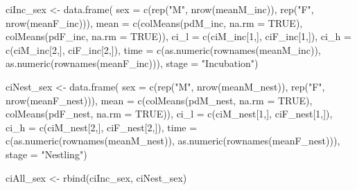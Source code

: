 \documentclass[
]{article}
\newenvironment{Shaded}{\begin{snugshade}}{\end{snugshade}}
\newcommand{\AttributeTok}[1]{\textcolor[rgb]{0.77,0.63,0.00}{#1}}
\newcommand{\ConstantTok}[1]{\textcolor[rgb]{0.00,0.00,0.00}{#1}}
\newcommand{\DecValTok}[1]{\textcolor[rgb]{0.00,0.00,0.81}{#1}}
\newcommand{\FunctionTok}[1]{\textcolor[rgb]{0.00,0.00,0.00}{#1}}
\newcommand{\NormalTok}[1]{#1}
\newcommand{\OtherTok}[1]{\textcolor[rgb]{0.56,0.35,0.01}{#1}}
\newcommand{\StringTok}[1]{\textcolor[rgb]{0.31,0.60,0.02}{#1}}
\begin{document}
\begin{Shaded}
\begin{Highlighting}[]
\NormalTok{ciInc\_sex }\OtherTok{\textless{}{-}} \FunctionTok{data.frame}\NormalTok{(}
    \AttributeTok{sex =} \FunctionTok{c}\NormalTok{(}\FunctionTok{rep}\NormalTok{(}\StringTok{"M"}\NormalTok{, }\FunctionTok{nrow}\NormalTok{(meanM\_inc)), }\FunctionTok{rep}\NormalTok{(}\StringTok{"F"}\NormalTok{, }\FunctionTok{nrow}\NormalTok{(meanF\_inc))),}
    \AttributeTok{mean =} \FunctionTok{c}\NormalTok{(}\FunctionTok{colMeans}\NormalTok{(pdM\_inc, }\AttributeTok{na.rm =} \ConstantTok{TRUE}\NormalTok{), }\FunctionTok{colMeans}\NormalTok{(pdF\_inc, }\AttributeTok{na.rm =} \ConstantTok{TRUE}\NormalTok{)),}
    \AttributeTok{ci\_l =} \FunctionTok{c}\NormalTok{(ciM\_inc[}\DecValTok{1}\NormalTok{,], ciF\_inc[}\DecValTok{1}\NormalTok{,]),}
    \AttributeTok{ci\_h =} \FunctionTok{c}\NormalTok{(ciM\_inc[}\DecValTok{2}\NormalTok{,], ciF\_inc[}\DecValTok{2}\NormalTok{,]),}
    \AttributeTok{time =} \FunctionTok{c}\NormalTok{(}\FunctionTok{as.numeric}\NormalTok{(}\FunctionTok{rownames}\NormalTok{(meanM\_inc)), }\FunctionTok{as.numeric}\NormalTok{(}\FunctionTok{rownames}\NormalTok{(meanF\_inc))),}
    \AttributeTok{stage =} \StringTok{"Incubation"}\NormalTok{)}


\NormalTok{ciNest\_sex }\OtherTok{\textless{}{-}} \FunctionTok{data.frame}\NormalTok{(}
    \AttributeTok{sex =} \FunctionTok{c}\NormalTok{(}\FunctionTok{rep}\NormalTok{(}\StringTok{"M"}\NormalTok{, }\FunctionTok{nrow}\NormalTok{(meanM\_nest)), }\FunctionTok{rep}\NormalTok{(}\StringTok{"F"}\NormalTok{, }\FunctionTok{nrow}\NormalTok{(meanF\_nest))),}
    \AttributeTok{mean =} \FunctionTok{c}\NormalTok{(}\FunctionTok{colMeans}\NormalTok{(pdM\_nest, }\AttributeTok{na.rm =} \ConstantTok{TRUE}\NormalTok{), }\FunctionTok{colMeans}\NormalTok{(pdF\_nest, }\AttributeTok{na.rm =} \ConstantTok{TRUE}\NormalTok{)),}
    \AttributeTok{ci\_l =} \FunctionTok{c}\NormalTok{(ciM\_nest[}\DecValTok{1}\NormalTok{,], ciF\_nest[}\DecValTok{1}\NormalTok{,]),}
    \AttributeTok{ci\_h =} \FunctionTok{c}\NormalTok{(ciM\_nest[}\DecValTok{2}\NormalTok{,], ciF\_nest[}\DecValTok{2}\NormalTok{,]),}
    \AttributeTok{time =} \FunctionTok{c}\NormalTok{(}\FunctionTok{as.numeric}\NormalTok{(}\FunctionTok{rownames}\NormalTok{(meanM\_nest)), }\FunctionTok{as.numeric}\NormalTok{(}\FunctionTok{rownames}\NormalTok{(meanF\_nest))),}
    \AttributeTok{stage =} \StringTok{"Nestling"}\NormalTok{)}
    
\NormalTok{ciAll\_sex }\OtherTok{\textless{}{-}} \FunctionTok{rbind}\NormalTok{(ciInc\_sex, ciNest\_sex)}
\end{Highlighting}
\end{Shaded}
\end{document}
